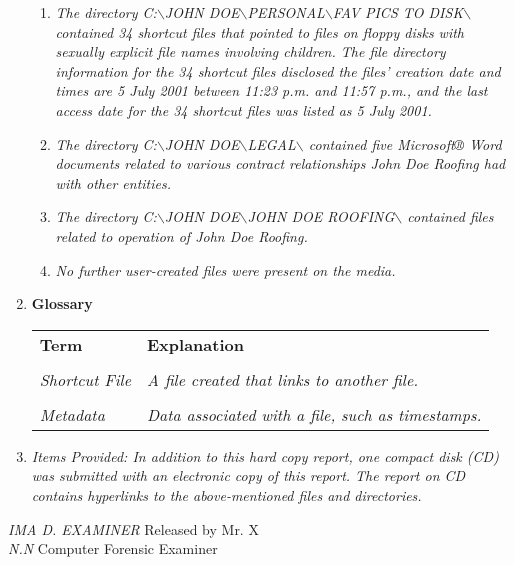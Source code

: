 \begin{enumerate}
\begin{enumerate}
\item \textit{The directory C:$\backslash$JOHN DOE$\backslash$PERSONAL$\backslash$FAV PICS TO DISK$\backslash$ contained 34 shortcut files that pointed to files on floppy disks with sexually explicit file names involving children. The file directory information for the 34 shortcut files disclosed the files’ creation date and times are 5 July 2001 between 11:23 p.m. and 11:57 p.m., and the last access date for the 34 shortcut files was listed as 5 July 2001.}

\item \textit{The directory C:$\backslash$JOHN DOE$\backslash$LEGAL$\backslash$ contained five Microsoft® Word documents related to various contract relationships John Doe Roofing had with other entities.} 

\item \textit{The directory C:$\backslash$JOHN DOE$\backslash$JOHN DOE ROOFING$\backslash$ contained files related to operation of John Doe Roofing.}

\item \textit{No further user-created files were present on the media.}
\end{enumerate}

\item \textbf{Glossary}\\

\begin{longtable}{p{}p{}}
\textbf{Term} & \textbf{Explanation}\\
&\\
\textit{Shortcut File} & \textit{A file created that links to another file.} \\
&\\
\textit{Metadata} & \textit{Data associated with a file, such as timestamps.} \\
\end{longtable}

\item \textit{Items Provided: In addition to this hard copy report, one compact disk (CD) was submitted with an electronic copy of this report. The report on CD contains hyperlinks to the above-mentioned files and directories.}

\end{enumerate}

\noindent \textit{IMA D. EXAMINER}	\hfill Released by {\wesa Mr. X}\\
\textit{N.N} Computer Forensic Examiner
\clearpage